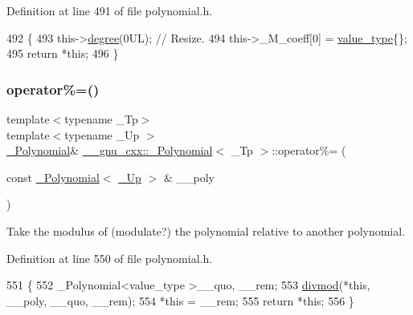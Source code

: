 Definition at line 491 of file polynomial.\+h.


\begin{DoxyCode}
492         \{
493           this->\hyperlink{class____gnu__cxx_1_1__Polynomial_a07d9933aeeb9afbd823218ed921336cb}{degree}(0UL); \textcolor{comment}{// Resize.}
494           this->\_M\_coeff[0] = \hyperlink{class____gnu__cxx_1_1__Polynomial_a725563351f50e76084a7a016c06f8a53}{value\_type}\{\};
495           \textcolor{keywordflow}{return} *\textcolor{keyword}{this};
496         \}
\end{DoxyCode}
\mbox{\label{class____gnu__cxx_1_1__Polynomial_a66661e25c272a310f7bf1abbcc8fa2a9}} 
\subsubsection{\texorpdfstring{operator\%=()}{operator\%=()}\hspace{0.1cm}{\footnotesize\ttfamily [2/2]}}
{\footnotesize\ttfamily template$<$typename \+\_\+\+Tp$>$ \\
template$<$typename \+\_\+\+Up $>$ \\
\hyperlink{class____gnu__cxx_1_1__Polynomial}{\+\_\+\+Polynomial}\& \hyperlink{class____gnu__cxx_1_1__Polynomial}{\+\_\+\+\_\+gnu\+\_\+cxx\+::\+\_\+\+Polynomial}$<$ \+\_\+\+Tp $>$\+::operator\%= (\begin{DoxyParamCaption}\item[{const \hyperlink{class____gnu__cxx_1_1__Polynomial}{\+\_\+\+Polynomial}$<$ \hyperlink{class____gnu__cxx_1_1__Polynomial_a242114d4b86648a5dff67a8221f80d40}{\+\_\+\+Up} $>$ \&}]{\+\_\+\+\_\+poly }\end{DoxyParamCaption})\hspace{0.3cm}{\ttfamily [inline]}}

Take the modulus of (modulate?) the polynomial relative to another polynomial. 

Definition at line 550 of file polynomial.\+h.


\begin{DoxyCode}
551         \{
552           \_Polynomial<value\_type >\_\_quo, \_\_rem;
553           \hyperlink{namespace____gnu__cxx_abe506cf34c921c378a681f0de31d49a5}{divmod}(*\textcolor{keyword}{this}, \_\_poly, \_\_quo, \_\_rem);
554           *\textcolor{keyword}{this} = \_\_rem;
555           \textcolor{keywordflow}{return} *\textcolor{keyword}{this};
556         \}
\end{DoxyCode}
\mbox{\label{class____gnu__cxx_1_1__Polynomial_a14a9a08043909e50269eef0d66995794}} 
